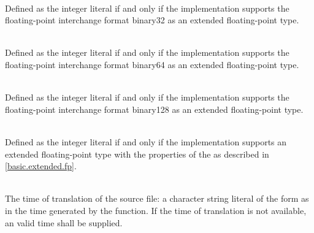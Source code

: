 \begin{description}
\item
{}%
\\
Defined as the integer literal 
if and only if the implementation supports
the \IsoFloatUndated{} floating-point interchange format binary32
as an extended floating-point type.

\item
{}%
\\
Defined as the integer literal 
if and only if the implementation supports
the \IsoFloatUndated{} floating-point interchange format binary64
as an extended floating-point type.

\item
{}%
\\
Defined as the integer literal 
if and only if the implementation supports
the \IsoFloatUndated{} floating-point interchange format binary128
as an extended floating-point type.

\item
{}%
\\
Defined as the integer literal 
if and only if the implementation supports an extended floating-point type
with the properties of the  
as described in \ref{basic.extended.fp}.

\item
{}%
\\
The time of translation of the source file:
a character string literal of the form
as in the time generated by the
function.
If the time of translation is not available,
an  valid time shall be supplied.
\end{description}

